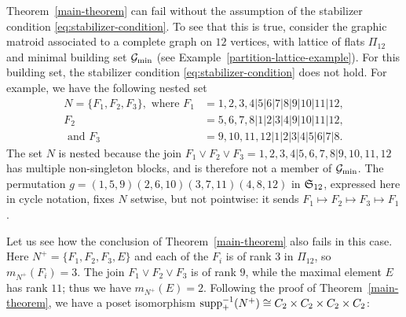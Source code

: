 \begin{remark}\rm \label{rmk:conclusion-failure}
Theorem~\ref{main-theorem} can fail without the
assumption of the stabilizer condition \eqref{eq:stabilizer-condition}. To see that this is true, consider the graphic matroid associated to a complete graph on $12$ vertices, with lattice of flats $\Pi_{12}$ and minimal building set $\mathcal{G}_{\min}$ (see Example~\ref{partition-lattice-example}). For this building set, the stabilizer condition \eqref{eq:stabilizer-condition} does not hold. For example, we have the following nested set 
    \begin{align*}
    N = \{F_1, F_2, F_3\}, \text{ where } F_1 &= 1,2,3,4|5|6|7|8|9|10|11|12, \\
    F_2 &= 5,6,7,8|1|2|3|4|9|10|11|12, \\ 
    \text{ and } F_3 &= 9,10,11,12|1|2|3|4|5|6|7|8.
    \end{align*}
The set $N$ is nested because the join $F_1 \vee F_2 \vee F_3 = 1,2,3,4|5,6,7,8|9,10,11,12$ has multiple non-singleton blocks, and is therefore not a member of $\mathcal{G}_{\min}$. The permutation $g = (1,5,9)(2,6,10)(3,7,11)(4,8,12)$ in $\mathfrak{S}_{12}$, expressed here in cycle notation, fixes $N$ setwise, but not pointwise:
it sends $F_1 \mapsto F_2 \mapsto F_3 \mapsto F_1$.


Let us see how the conclusion of Theorem~\ref{main-theorem} also fails in this case. Here $N^+=\{F_1,F_2,F_3, E\}$ and each of the $F_i$ is of rank $3$ in $\Pi_{12}$, so $m_{N^+}(F_i)=3$. The join $F_1 \vee F_2 \vee F_3$ is of rank $9$, while the maximal element $E$ has rank $11$; thus we have $m_{N^+}(E)=2$. Following the proof of Theorem~\ref{main-theorem}, we have a poset isomorphism $\mathrm{supp}_+^{-1}(N^+) \cong C_2 \times C_2 \times C_2 \times C_2$:

\end{remark}
